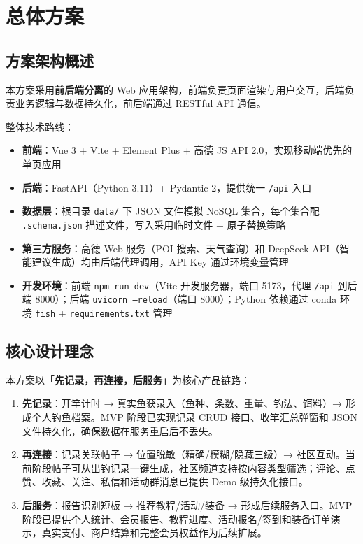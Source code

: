 \section{总体方案}

\subsection{方案架构概述}

本方案采用\textbf{前后端分离}的 Web 应用架构，前端负责页面渲染与用户交互，后端负责业务逻辑与数据持久化，前后端通过 RESTful API 通信。

整体技术路线：

\begin{itemize}
  \item \textbf{前端}：Vue 3 + Vite + Element Plus + 高德 JS API 2.0，实现移动端优先的单页应用
  \item \textbf{后端}：FastAPI（Python 3.11）+ Pydantic 2，提供统一 \texttt{/api} 入口
  \item \textbf{数据层}：根目录 \texttt{data/} 下 JSON 文件模拟 NoSQL 集合，每个集合配 \texttt{.schema.json} 描述文件，写入采用临时文件 + 原子替换策略
  \item \textbf{第三方服务}：高德 Web 服务（POI 搜索、天气查询）和 DeepSeek API（智能建议生成）均由后端代理调用，API Key 通过环境变量管理
  \item \textbf{开发环境}：前端 \texttt{npm run dev}（Vite 开发服务器，端口 5173，代理 \texttt{/api} 到后端 8000）；后端 \texttt{uvicorn --reload}（端口 8000）；Python 依赖通过 conda 环境 \texttt{fish} + \texttt{requirements.txt} 管理
\end{itemize}

\subsection{核心设计理念}

本方案以「\textbf{先记录，再连接，后服务}」为核心产品链路：

\begin{enumerate}
  \item \textbf{先记录}：开竿计时 → 真实鱼获录入（鱼种、条数、重量、钓法、饵料）→ 形成个人钓鱼档案。MVP 阶段已实现记录 CRUD 接口、收竿汇总弹窗和 JSON 文件持久化，确保数据在服务重启后不丢失。
  \item \textbf{再连接}：记录关联帖子 → 位置脱敏（精确/模糊/隐藏三级）→ 社区互动。当前阶段帖子可从出钓记录一键生成，社区频道支持按内容类型筛选；评论、点赞、收藏、关注、私信和活动群消息已提供 Demo 级持久化接口。
  \item \textbf{后服务}：报告识别短板 → 推荐教程/活动/装备 → 形成后续服务入口。MVP 阶段已提供个人统计、会员报告、教程进度、活动报名/签到和装备订单演示，真实支付、商户结算和完整会员权益作为后续扩展。
\end{enumerate}

